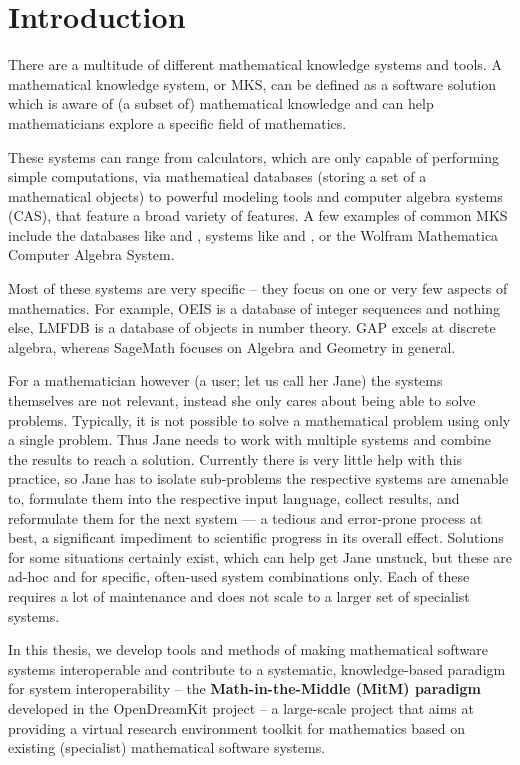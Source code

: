 \section{Introduction}\label{sec:intro}

There are a multitude of different mathematical knowledge systems and tools. 
A mathematical knowledge system, or MKS, can be defined as a software solution which is aware of (a subset of) mathematical knowledge and can help mathematicians explore a specific field of mathematics. 

These systems can range from calculators, which are only capable of performing simple computations, via mathematical databases (storing a set of a mathematical objects) to powerful modeling tools and computer algebra systems (CAS), that feature a broad variety of features.
A few examples of common MKS include the databases like \cite{oeis} and \cite{lmfdb}, systems like \cite{gap} and \cite{sagemath}, or the Wolfram Mathematica \cite{mathematica11} Computer Algebra System. 

Most of these systems are very specific -- they focus on one or very few aspects of mathematics. 
For example, OEIS is a database of integer sequences and nothing else, 
LMFDB is a database of objects in number theory. 
GAP excels at discrete algebra, whereas SageMath focuses on Algebra and Geometry in general. 

For a mathematician however (a user; let us call her Jane) the systems themselves are not relevant, instead she only cares about being able to solve problems. 
Typically, it is not possible to solve a mathematical problem using only a single problem. 
Thus Jane needs to work with multiple systems and combine the results to reach a solution. 
Currently there is very little help with this practice, so Jane has to isolate sub-problems the respective systems are amenable to, formulate them into the respective input language, collect results, and reformulate them for the next system — a tedious and error-prone process at best, a significant impediment to scientific progress in its overall effect. 
Solutions for some situations certainly exist, which can help get Jane unstuck, but these are ad-hoc and for specific, often-used system combinations only. 
Each of these requires a lot of maintenance and does not scale to a larger set of specialist systems. 

In this thesis, we develop tools and methods of making mathematical software systems interoperable and contribute to a systematic, knowledge-based paradigm for system interoperability -- the \textbf{Math-in-the-Middle (MitM) paradigm} developed in the OpenDreamKit project -- a large-scale project that aims at providing a virtual research environment toolkit for mathematics based on existing (specialist) mathematical software systems. 

